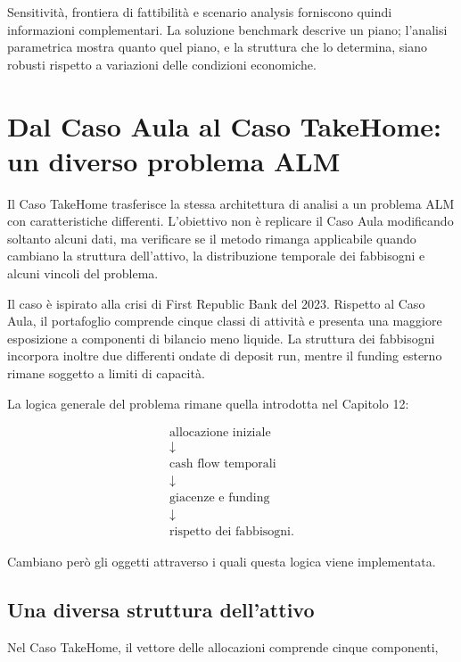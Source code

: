 Sensitivit\`a, frontiera di fattibilit\`a e scenario analysis forniscono
quindi informazioni complementari. La soluzione benchmark descrive un piano;
l'analisi parametrica mostra quanto quel piano, e la struttura che lo
determina, siano robusti rispetto a variazioni delle condizioni economiche.



\section{Dal Caso Aula al Caso TakeHome: un diverso problema ALM}

Il Caso TakeHome trasferisce la stessa architettura di analisi a un problema
ALM con caratteristiche differenti. L'obiettivo non \`e replicare il Caso
Aula modificando soltanto alcuni dati, ma verificare se il metodo rimanga
applicabile quando cambiano la struttura dell'attivo, la distribuzione
temporale dei fabbisogni e alcuni vincoli del problema.

Il caso \`e ispirato alla crisi di First Republic Bank del 2023. Rispetto al
Caso Aula, il portafoglio comprende cinque classi di attivit\`a e presenta una
maggiore esposizione a componenti di bilancio meno liquide. La struttura dei
fabbisogni incorpora inoltre due differenti ondate di deposit run, mentre il
funding esterno rimane soggetto a limiti di capacit\`a.

La logica generale del problema rimane quella introdotta nel Capitolo 12:

\vspace{-0.3cm}

\begin{gather*}
\text{allocazione iniziale}\\
\downarrow\\
\text{cash flow temporali}\\
\downarrow\\
\text{giacenze e funding}\\
\downarrow\\
\text{rispetto dei fabbisogni}.
\end{gather*}


Cambiano per\`o gli oggetti attraverso i quali questa logica viene
implementata.

\subsection{Una diversa struttura dell'attivo}

Nel Caso TakeHome, il vettore delle allocazioni comprende cinque componenti,

